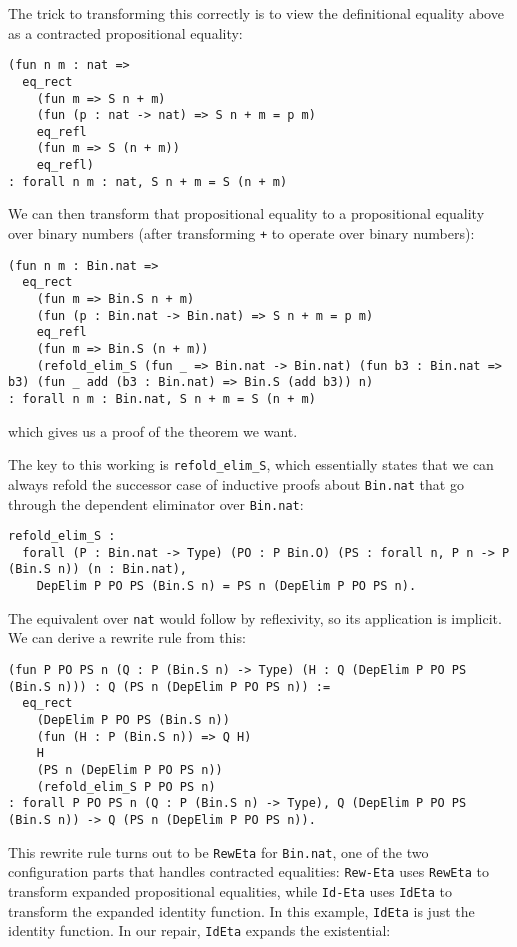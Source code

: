 The trick to transforming this correctly is to view the definitional equality above as a contracted propositional equality:

\begin{lstlisting}
(fun n m : nat =>
  eq_rect
    (fun m => S n + m)
    (fun (p : nat -> nat) => S n + m = p m)
    eq_refl
    (fun m => S (n + m))
    eq_refl)
: forall n m : nat, S n + m = S (n + m)
\end{lstlisting}
We can then transform that propositional equality to a propositional equality over binary numbers (after transforming \lstinline{+} to operate
over binary numbers):

\begin{lstlisting}
(fun n m : Bin.nat =>
  eq_rect
    (fun m => Bin.S n + m)
    (fun (p : Bin.nat -> Bin.nat) => S n + m = p m)
    eq_refl
    (fun m => Bin.S (n + m))
    (refold_elim_S (fun _ => Bin.nat -> Bin.nat) (fun b3 : Bin.nat => b3) (fun _ add (b3 : Bin.nat) => Bin.S (add b3)) n)
: forall n m : Bin.nat, S n + m = S (n + m)
\end{lstlisting}
which gives us a proof of the theorem we want.

The key to this working is \lstinline{refold_elim_S}, which essentially states that
we can always refold the successor case of inductive proofs about \lstinline{Bin.nat}
that go through the dependent eliminator over \lstinline{Bin.nat}:

\begin{lstlisting}
refold_elim_S :
  forall (P : Bin.nat -> Type) (PO : P Bin.O) (PS : forall n, P n -> P (Bin.S n)) (n : Bin.nat),
    DepElim P PO PS (Bin.S n) = PS n (DepElim P PO PS n).
\end{lstlisting}
The equivalent over \lstinline{nat} would follow by reflexivity, so its application is implicit.
We can derive a rewrite rule from this:

\begin{lstlisting}
(fun P PO PS n (Q : P (Bin.S n) -> Type) (H : Q (DepElim P PO PS (Bin.S n))) : Q (PS n (DepElim P PO PS n)) :=
  eq_rect
    (DepElim P PO PS (Bin.S n))
    (fun (H : P (Bin.S n)) => Q H)
    H
    (PS n (DepElim P PO PS n))
    (refold_elim_S P PO PS n)
: forall P PO PS n (Q : P (Bin.S n) -> Type), Q (DepElim P PO PS (Bin.S n)) -> Q (PS n (DepElim P PO PS n)).
\end{lstlisting}
This rewrite rule turns out to be \lstinline{RewEta} for \lstinline{Bin.nat}, one of the two configuration parts that 
handles contracted equalities:
\lstinline{Rew-Eta} uses \lstinline{RewEta} to transform expanded propositional equalities, while
\lstinline{Id-Eta} uses \lstinline{IdEta} to transform the expanded identity function.
In this example, \lstinline{IdEta} is just the identity function.
In our repair, \lstinline{IdEta} expands the existential:

